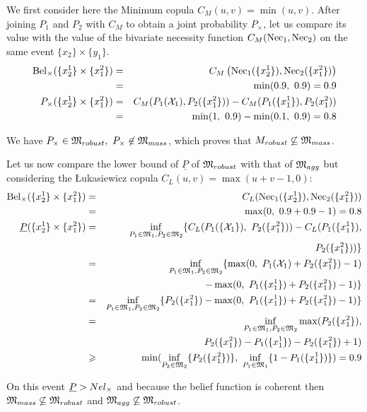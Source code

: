 \begin{example}
    
    We first consider here the Minimum copula $C_M(u,v)=\min(u,v)$. After joining $P_1$ and $P_2$ with $C_M$ to obtain a joint probability $P_\times$, let us compare its value with the value of the bivariate necessity function $C_M({\mathrm{Nec}}_1, {\mathrm{Nec}}_2)$ on the same event $\{x_2\}\times\{y_1\}$.
    \begin{eqnarray*}
        {\mathrm{Bel}}_\times(\{x^1_2\}\times\{x^2_1\}) &=& C_M\left({\mathrm{Nec}}_1(\{x^1_2\}), {\mathrm{Nec}}_2(\{x^2_1\})\right)\\
        &=& \min(0.9,~0.9) = 0.9\\
        P_\times(\{x^1_2\}\times\{x^2_1\}) &=& C_M(P_1({\mathcal{X}}_1), P_2(\{x^2_1\})) - C_M(P_1(\{x^1_1\}),P_2(x^2_1))\\
        &=& \min(1,~0.9) - \min(0.1,~0.9) = 0.8
    \end{eqnarray*}
    
    We have $P_\times\in{\mathfrak{M}}_{robust}, ~P_\times\not\in{\mathfrak{M}}_{mass}$, which proves that ${M}_{robust}\not\subseteq{\mathfrak{M}}_{mass}$.
    
    Let us now compare the lower bound of $\underline{P}$ of ${\mathfrak{M}}_{robust}$ with that of ${\mathfrak{M}}_{agg}$ but considering the \L ukasiewicz copula $C_L(u,v)=\max(u+v-1,0)$:
    \begin{eqnarray*}
        {\mathrm{Bel}}_\times(\{x^1_2\}\times\{x^2_1\}) &=& C_L({\mathrm{Nec}}_1(\{x^1_2\}), {\mathrm{Nec}}_2(\{x^2_1\}))\\
        &=& \max(0,~0.9 + 0.9 - 1) = 0.8\\
        {\underline{P}}(\{x^1_2\}\times\{x^2_1\}) &=& \inf_{P_1\in{\mathfrak{M}}_1, P_2\in{\mathfrak{M}}_2}\{C_L(P_1(\{{\mathcal{X}}_1\}),~P_2(\{x^2_1\})) - C_L(P_1(\{x^1_1\}),\\
        && P_2(\{x^2_1\}))\}\\
        &=& \inf_{P_1\in{\mathfrak{M}}_1, P_2\in{\mathfrak{M}}_2}\{\max(0,~P_1({\mathcal{X}}_1) + P_2(\{x^2_1\}) - 1)\\
        && - \max(0,~P_1(\{x^1_1\}) + P_2(\{x^2_1\}) -1)\}\\
        &=& \inf_{P_1\in{\mathfrak{M}}_1, P_2\in{\mathfrak{M}}_2}\{P_2(\{x^2_1\}) - \max(0,~P_1(\{x^1_1\}) + P_2(\{x^2_1\}) - 1 )\}\\
        &=& \inf_{P_1\in{\mathfrak{M}}_1, P_2\in{\mathfrak{M}}_2}\max(P_2(\{x^2_1\}),\\
        && P_2(\{x^2_1\})-P_1(\{x^1_1\}) - P_2(\{x^2_1\}) + 1 )\\
        &\geqslant& \min(\inf_{P_2\in{\mathfrak{M}}_2}\{P_2(\{x^2_1\})\},~\inf_{P_1\in{\mathfrak{M}}_1}\{1-P_1(\{x^1_1\})\}) = 0.9
    \end{eqnarray*}
    
    On this event ${\underline{P}}>Nel_\times$ and because the belief function is coherent then ${\mathfrak{M}}_{mass}\not\subseteq{\mathfrak{M}}_{robust}$ and ${\mathfrak{M}}_{agg}\not\subseteq{\mathfrak{M}}_{robust}$.
\end{example}

